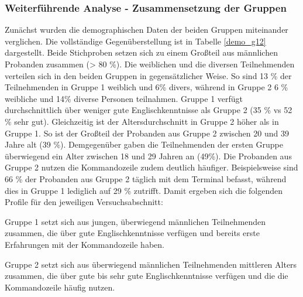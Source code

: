 \subsubsection{Weiterführende Analyse - Zusammensetzung der Gruppen}
Zunächst wurden die demographischen Daten der beiden Gruppen miteinander verglichen. Die vollständige Gegenüberstellung ist in Tabelle \ref{demo_g12} dargestellt. Beide Stichproben setzen sich zu einem Großteil aus männlichen Probanden zusammen (> 80 \%). Die weiblichen und die diversen Teilnehmenden verteilen sich in den beiden Gruppen in gegensätzlicher Weise. So sind 13 \% der Teilnehmenden in Gruppe 1 weiblich und 6\% divers, während in Gruppe 2 6 \% weibliche und 14\% diverse Personen teilnahmen. Gruppe 1 verfügt durchschnittlich über weniger gute Englischkenntnisse als Gruppe 2 (35 \% vs 52 \% sehr gut). Gleichzeitig ist der Altersdurchschnitt in Gruppe 2 höher als in Gruppe 1. So ist der Großteil der Probanden aus Gruppe 2 zwischen 20 und 39 Jahre alt (39 \%). Demgegenüber gaben die Teilnehmenden der ersten Gruppe überwiegend ein Alter zwischen 18 und 29 Jahren an (49\%). Die Probanden aus Gruppe 2 nutzen die Kommandozeile zudem deutlich häufiger. Beispielsweise sind 66 \% der Probanden aus Gruppe 2  täglich mit dem Terminal befasst, während dies in Gruppe 1 lediglich auf 29 \% zutrifft. Damit ergeben sich die folgenden Profile für den jeweiligen Versuchsabschnitt:

Gruppe 1 setzt sich aus jungen, überwiegend männlichen Teilnehmenden zusammen, die über gute Englischkenntnisse verfügen und bereits erste Erfahrungen mit der Kommandozeile haben. 

Gruppe 2 setzt sich aus überwiegend männlichen Teilnehmenden mittleren Alters zusammen, die über gute bis sehr gute Englischkenntnisse verfügen und die die Kommandozeile häufig nutzen. 

